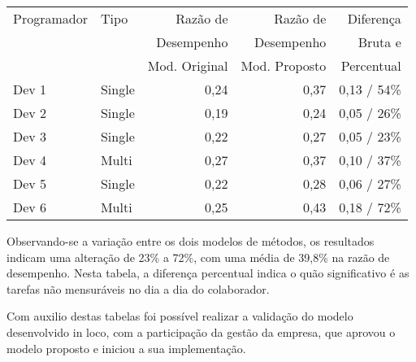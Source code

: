 \begin{center}
\begin{tabular}{ | l | l | r | r | r | } 
 \hline
 Programador & Tipo & Razão de & Razão de & Diferença \\ 
 & & Desempenho & Desempenho & Bruta e  \\ 
 & & Mod. Original & Mod. Proposto & Percentual \\ \hline
 Dev 1 & Single & 0,24 & 0,37 & 0,13 / 54\% \\
 Dev 2 & Single & 0,19 & 0,24 & 0,05 / 26\% \\
 Dev 3 & Single & 0,22 & 0,27 & 0,05 / 23\% \\
 Dev 4 & Multi  & 0,27 & 0,37 & 0,10 / 37\% \\
 Dev 5 & Single & 0,22 & 0,28 & 0,06 / 27\% \\
 Dev 6 & Multi  & 0,25 & 0,43 & 0,18 / 72\% \\
 \hline
\end{tabular}
\end{center}

Observando-se a variação entre os dois modelos de métodos, os resultados indicam uma alteração de 23\% a 72\%, com uma média de 39,8\% na razão de desempenho. Nesta tabela, a diferença percentual indica o quão significativo é as tarefas não mensuráveis no dia a dia do colaborador.\par
Com auxilio destas tabelas foi possível realizar a validação do modelo desenvolvido in loco, com a participação da gestão da empresa, que aprovou o modelo proposto e iniciou a sua implementação.